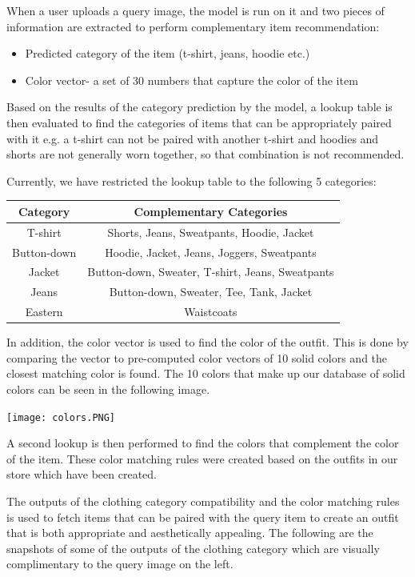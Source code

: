 When a user uploads a query image, the model is run on it and two pieces of information are extracted to perform complementary item recommendation:
\begin{itemize}
    \item Predicted category of the item (t-shirt, jeans, hoodie etc.)
    \item Color vector- a set of 30 numbers that capture the color of the item
\end{itemize}

Based on the results of the category prediction by the model, a lookup table is then evaluated to find the categories of items that can be appropriately paired with it e.g. a t-shirt can not be paired with another t-shirt and hoodies and shorts are not generally worn together, so that combination is not recommended.

Currently, we have restricted the lookup table to the following 5 categories:

\begin{center}
\begin{tabular}{ |c|c| } 
 \hline
 \textbf{Category} & \textbf{Complementary Categories}\\
 \hline
T-shirt & Shorts, Jeans, Sweatpants, Hoodie, Jacket\\
 \hline
Button-down & Hoodie, Jacket, Jeans, Joggers, Sweatpants\\
 \hline
Jacket & Button-down, Sweater, T-shirt, Jeans, Sweatpants\\
 \hline
Jeans & Button-down, Sweater, Tee, Tank, Jacket\\
 \hline
 Eastern & Waistcoats\\
  \hline
\end{tabular}
\end{center}


In addition, the color vector is used to find the color of the outfit. This is done by comparing the vector to pre-computed color vectors of 10 solid colors and the closest matching color is found. The 10 colors that make up our database of solid colors can be seen in the following image.

\texttt{[image: colors.PNG]}

A second lookup is then performed to find the colors that complement the color of the item. These color matching rules were created based on the outfits in our store which have been created.

The outputs of the clothing category compatibility and the color matching rules is used to fetch items that can be paired with the query item to create an outfit that is both appropriate and aesthetically appealing. The following are the snapshots of some of the outputs of the clothing category which are visually complimentary to the query image on the left. 

